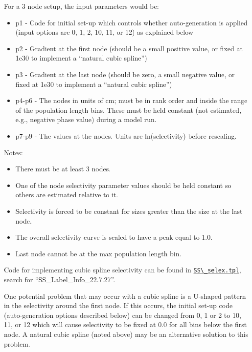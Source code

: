 For a 3 node setup, the input parameters would be:
	\begin{itemize}
		\item p1 - Code for initial set-up which controls whether auto-generation is applied (input options are 0, 1, 2, 10, 11, or 12) as explained below
		\item p2 - Gradient at the first node (should be a small positive value, or fixed at 1e30 to implement a ``natural cubic spline'')
		\item p3 - Gradient at the last node (should be zero, a small negative value, or fixed at 1e30 to implement a ``natural cubic spline'')
		\item p4-p6 - The nodes in units of cm; must be in rank order and inside the range of the population length bins. These must be held constant (not estimated, e.g., negative phase value) during a model run.
		\item p7-p9 - The values at the nodes. Units are ln(selectivity) before rescaling.
	\end{itemize}

Notes:
	\begin{itemize}
		\item There must be at least 3 nodes.
		\item One of the node selectivity parameter values should be held constant so others are estimated relative to it.
		\item Selectivity is forced to be constant for sizes greater than the size at the last node.
		\item The overall selectivity curve is scaled to have a peak equal to 1.0.
		\item Last node cannot be at the max population length bin.
	\end{itemize}
	
Code for implementing cubic spline selectivity can be found in
\href{https://github.com/nmfs-ost/ss3-source-code/blob/main/SS_selex.tpl}{\verb|SS\_selex.tpl|},
search for ``SS\_Label\_Info\_22.7.27''.

One potential problem that may occur with a cubic spline is a U-shaped pattern in the selectivity around the first node. If this occurs, the initial set-up code (auto-generation options described below) can be changed from 0, 1 or 2 to 10, 11, or 12 which will cause selectivity to be fixed at 0.0 for all bins below the first node. A natural cubic spline (noted above) may be an alternative solution to this problem.

